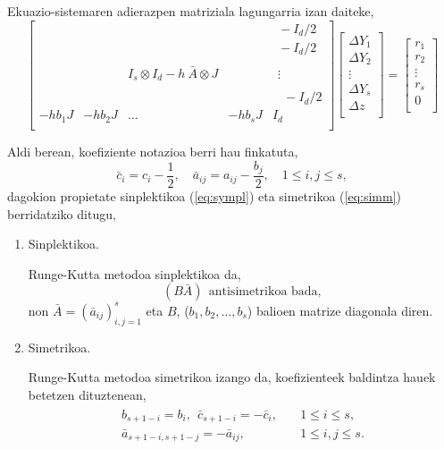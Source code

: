 Ekuazio-sistemaren adierazpen matriziala lagungarria izan daiteke,
\begin{equation*}
\begin{bmatrix}
    &      &      &  & \ \ -I_d/2 \\
    &      &      &  & \ \ -I_d/2 \\
    &      &      &  & \ \      \\    
    &  & I_s \otimes I_d- h \ \bar{A} \otimes J & & \ \ \vdots \\
    &      &      &  & \ \      \\
    &      &      &  & \ \ \ \ -I_d/2    \\
-hb_1 J & -hb_2 J & \dots & -hb_s J &  I_d\\ 
\end{bmatrix}
\begin{bmatrix}
\Delta Y_1 \\
\Delta Y_2 \\
\vdots \\
\Delta Y_s \\
\Delta z\\
\end{bmatrix}=
\begin{bmatrix}
r_1 \\
r_2 \\
\vdots \\
r_s \\
0\\
\end{bmatrix}
\end{equation*} 

Aldi berean, koefiziente notazioa berri hau finkatuta,
\begin{equation*}
\bar{c}_i=c_i-\frac{1}{2}, \quad \bar{a}_{ij}=a_{ij}-\frac{b_j}{2}, \quad 1\leqslant i,j \leqslant s,
\end{equation*}
dagokion propietate sinplektikoa (\ref{eq:sympl}) eta simetrikoa (\ref{eq:simm}) berridatziko ditugu,
\begin{enumerate}
\item {Sinplektikoa.}

Runge-Kutta metodoa sinplektikoa da,
\begin{equation}
\label{eq:eqlineala}
(B \bar{A}) \ \ \mbox{antisimetrikoa bada},
\end{equation}
non $\bar{A}=(\bar{a}_{ij})_{i,j=1}^s$ eta $B$, ($b_1,b_2,\dots,b_s$) balioen matrize diagonala diren.

\item {Simetrikoa.}

Runge-Kutta metodoa simetrikoa izango da, koefizienteek baldintza hauek betetzen dituztenean,
\begin{align}
\label{eq:simm2}
\begin{split}
b_{s+1-i}=b_i, \ \ \bar{c}_{s+1-i}=-\bar{c}_i,& \quad 1\leq i \leq s, \\
\bar{a}_{s+1-i,s+1-j}=-\bar{a}_{ij},& \quad 1\leq i,j \leq s. 
\end{split}
\end{align} 

\end{enumerate}

